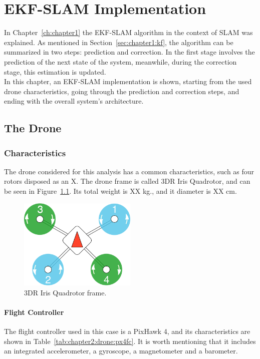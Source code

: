 \chapter{EKF-SLAM Implementation}
\label{ch:chapter2}
In Chapter~\ref{ch:chapter1} the EKF-SLAM algorithm in the context of SLAM was explained. As mentioned in Section~\ref{sec:chapter1:kf}, the algorithm can be summarized in two steps: prediction and correction. In the first stage involves the prediction of the next state of the system, meanwhile, during the correction stage, this estimation is updated. \\

In this chapter, an EKF-SLAM implementation is shown, starting from the used drone characteristics, going through the prediction and correction steps, and ending with the overall system's architecture.

\section{The Drone}
\label{sec:chapter2:drone}
\subsection{Characteristics}
\label{subsec:chapter2:drone:characteristics}
The drone considered for this analysis has a common characteristics, such as four rotors disposed as an X. The drone frame is called 3DR Iris Quadrotor, and can be seen in Figure~\ref{fig:chapter2:drone:frame}. Its total weight is XX kg., and it diameter is XX cm.\\

\begin{figure}
    \centering
    \includegraphics[width=0.5\textwidth]{Images/fig4-quad-frame.png}
    \caption{3DR Iris Quadrotor frame.}
    \label{fig:chapter2:drone:frame}
\end{figure}

\subsubsection{Flight Controller}
The flight controller used in this case is a PixHawk 4, and its characteristics are shown in Table~\ref{tab:chapter2:drone:px4fc}. It is worth mentioning that it includes an integrated accelerometer, a gyroscope, a magnetometer and a barometer.

